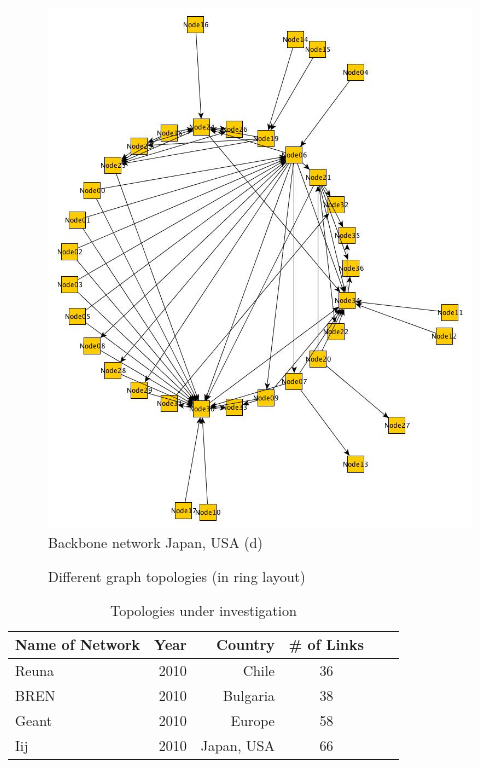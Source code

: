 \begin{figure}[h!]
\begin{minipage}[c]{0.45\textwidth}
    \includegraphics[width=\linewidth]{Iij.jpg}
    Backbone network Japan, USA (d)
    \end{minipage}
   \caption{Different graph topologies (in ring layout)}
   \label{fig:graphs}
\end{figure}
\begin{table}
\centering
\begin{tabular}{lrrcrr}
	\hline
	Name of Network & Year & Country & \# of Links\\%
    \hline
    Reuna & 2010 & Chile & 36\\%
    BREN & 2010 & Bulgaria & 38\\%
    Geant & 2010 & Europe & 58\\%
    Iij & 2010 & Japan, USA & 66\\%
    \hline
\end{tabular}
\caption{Topologies under investigation}
\label{table:network}
\end{table}

